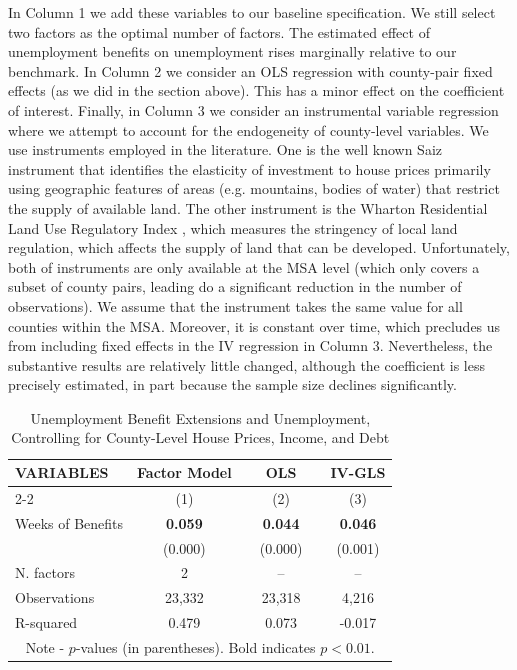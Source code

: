\documentclass[12pt]{article}
\newcommand{\1}{\mathbf{1}}
\begin{document}
\begin{appendix}
In Column 1 we add these variables to our baseline specification. We still select two factors as the optimal number of factors. The estimated effect of unemployment benefits on unemployment rises marginally relative to our benchmark. In Column 2 we consider an OLS regression with county-pair fixed effects (as we did in the section above). This has a minor effect on the coefficient of interest. Finally, in Column 3 we consider an instrumental variable regression where we attempt to account for the endogeneity of county-level variables. We use instruments employed in the literature. One is the well known Saiz instrument \citep{saiz:10} that identifies the elasticity of investment to house prices primarily using geographic features of areas (e.g. mountains, bodies of water) that restrict the supply of available land. The other instrument is the Wharton Residential Land Use Regulatory Index \citep{gyourko+saiz+summers:08}, which measures the stringency of local land regulation, which affects the supply of land that can be developed. Unfortunately, both of instruments are only available at the MSA level (which only covers a subset of county pairs, leading do a significant reduction in the number of observations). We assume that the instrument takes the same value for all counties within the MSA. Moreover, it is constant over time, which precludes us from including fixed effects in the IV regression in Column 3. Nevertheless, the substantive results are relatively little changed, although the coefficient is less precisely estimated, in part because the sample size declines significantly. 

\begin{table}[H]
  \centering
	\captionsetup{justification=centering}
   \caption{Unemployment Benefit Extensions and Unemployment, \\ Controlling for County-Level House Prices, Income, and Debt} \label{tab:Endog_Vars}
\small
    \begin{tabular}{lccccc} \hline
    VARIABLES & Factor Model &&  OLS &&  IV-GLS \\ \cline{2-2} \cline{4-4} \cline{6-6}
    				  & (1) && (2) && (3) \\ \hline
Weeks of  Benefits & \bf{0.059} && \bf{0.044} && \bf{0.046} \\
									 & (0.000)	  && (0.000)	 	 &&  (0.001)\\

N. factors   & 2 && -- && --   \\
Observations & 23,332 && 23,318 && 4,216  \\
R-squared    & 0.479 && 0.073 && -0.017  \\ \hline
\multicolumn{6}{c}{\footnotesize Note - $p$-values (in parentheses). Bold indicates $p<0.01$.} \\
\end{tabular}
\vspace{-0.2cm}
\end{table}



\end{appendix}
\end{document}
